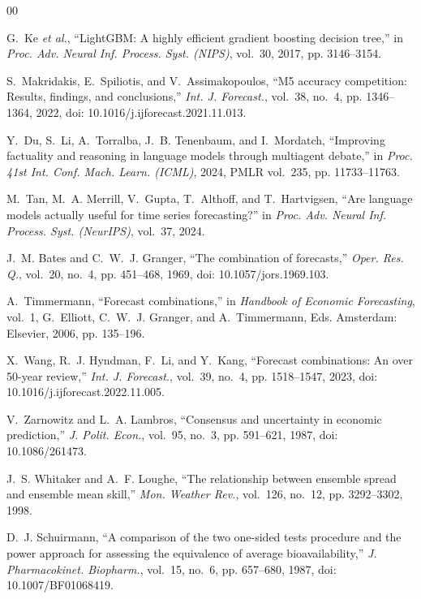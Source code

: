 \documentclass[conference]{IEEEtran}
\begin{document}
\begin{thebibliography}{00}

G.~Ke \emph{et al.}, ``LightGBM: A highly efficient gradient boosting decision tree,'' in
\emph{Proc. Adv. Neural Inf. Process. Syst. (NIPS)}, vol.~30, 2017, pp. 3146--3154.

S.~Makridakis, E.~Spiliotis, and V.~Assimakopoulos, ``M5 accuracy competition: Results, findings,
and conclusions,'' \emph{Int. J. Forecast.}, vol.~38, no.~4, pp. 1346--1364, 2022,
doi: 10.1016/j.ijforecast.2021.11.013.

Y.~Du, S.~Li, A.~Torralba, J.~B. Tenenbaum, and I.~Mordatch, ``Improving factuality and reasoning
in language models through multiagent debate,'' in \emph{Proc. 41st Int. Conf. Mach. Learn.
(ICML)}, 2024, PMLR vol.~235, pp. 11733--11763.

M.~Tan, M.~A. Merrill, V.~Gupta, T.~Althoff, and T.~Hartvigsen, ``Are language models actually
useful for time series forecasting?'' in \emph{Proc. Adv. Neural Inf. Process. Syst. (NeurIPS)},
vol.~37, 2024.

J.~M. Bates and C.~W.~J. Granger, ``The combination of forecasts,'' \emph{Oper. Res. Q.}, vol.~20,
no.~4, pp. 451--468, 1969, doi: 10.1057/jors.1969.103.

A.~Timmermann, ``Forecast combinations,'' in \emph{Handbook of Economic Forecasting}, vol.~1,
G.~Elliott, C.~W.~J. Granger, and A.~Timmermann, Eds. Amsterdam: Elsevier, 2006, pp. 135--196.

X.~Wang, R.~J. Hyndman, F.~Li, and Y.~Kang, ``Forecast combinations: An over 50-year review,''
\emph{Int. J. Forecast.}, vol.~39, no.~4, pp. 1518--1547, 2023,
doi: 10.1016/j.ijforecast.2022.11.005.

V.~Zarnowitz and L.~A. Lambros, ``Consensus and uncertainty in economic prediction,'' \emph{J.
Polit. Econ.}, vol.~95, no.~3, pp. 591--621, 1987, doi: 10.1086/261473.

J.~S. Whitaker and A.~F. Loughe, ``The relationship between ensemble spread and ensemble mean
skill,'' \emph{Mon. Weather Rev.}, vol.~126, no.~12, pp. 3292--3302, 1998.

D.~J. Schuirmann, ``A comparison of the two one-sided tests procedure and the power approach for
assessing the equivalence of average bioavailability,'' \emph{J. Pharmacokinet. Biopharm.},
vol.~15, no.~6, pp. 657--680, 1987, doi: 10.1007/BF01068419.


\end{thebibliography}
\end{document}

